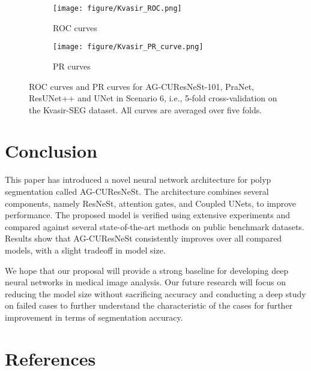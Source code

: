\documentclass[review, sort&compress]{elsarticle}
\begin{document}
	
	\begin{figure} [h!]
		\centering
		\begin{subfigure}[b]{0.49\textwidth}
			\centering
			\texttt{[image: figure/Kvasir\_ROC.png]}
			\caption{ROC curves}
		\end{subfigure}
		\hfill
		\begin{subfigure}[b]{0.49\textwidth}
			\centering
			\texttt{[image: figure/Kvasir\_PR\_curve.png]}
			\caption{PR curves}
		\end{subfigure}
		\caption{ROC curves and PR curves for AG-CUResNeSt-101, PraNet, ResUNet++ and UNet in Scenario 6, i.e., 5-fold cross-validation on the Kvasir-SEG dataset. All curves are averaged over five folds.}
		\label{fig_kvasir_ROC}
	\end{figure}
	




	\section{Conclusion}
	\label{sec:conclude}
	This paper has introduced a novel neural network architecture for polyp segmentation called AG-CUResNeSt. The architecture combines several components, namely ResNeSt, attention gates, and Coupled UNets, to improve performance. The proposed model is verified using extensive experiments and compared against several state-of-the-art methods on public benchmark datasets. Results show that AG-CUResNeSt consistently improves over all compared models, with a slight tradeoff in model size.
	
	We hope that our proposal will provide a strong baseline for developing deep neural networks in medical image analysis. Our future research will focus on reducing the model size without sacrificing accuracy and conducting a deep study on failed cases to further understand the characteristic of the cases for further improvement in terms of segmentation accuracy. 



	\section*{References}
	
	
\end{document}
